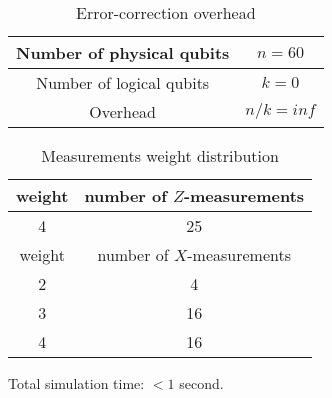 \documentclass[12pt]{article}
\begin{document}
\newpage
\begin{table}[h]
\centering
\begin{tabular}{c c}
\hline
Number of physical qubits & $n = 60$ \\
\hline
Number of logical qubits & $k = 0$\\
\hline
Overhead & $n/k = inf$\\
\hline
\end{tabular}
\caption{Error-correction overhead}
\end{table}
\vspace{.3cm}


\begin{table}[h]
\centering
\begin{tabular}{c c}
\hline
weight & number of $Z$-measurements\\
\hline
4 & 25\\
\hline
\hline
weight & number of $X$-measurements\\
\hline
2 & 4\\
3 & 16\\
4 & 16\\
\hline
\end{tabular}
\caption{Measurements weight distribution}
\end{table}
\vspace{.3cm}



\vspace{2cm}
Total simulation time: $< 1$ second.
\end{document}
